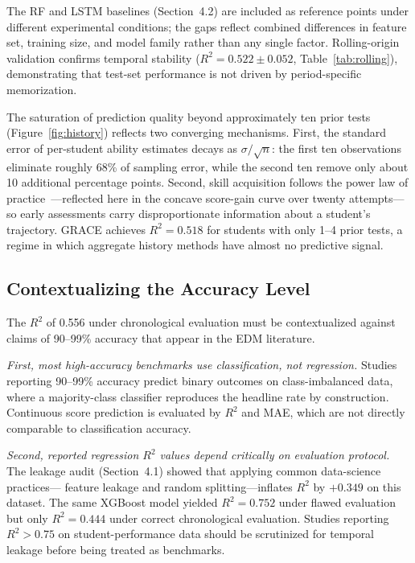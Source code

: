 \documentclass[11pt]{article}
\begin{document}
The RF and LSTM baselines (Section~4.2) are included as reference points under
different experimental conditions; the gaps reflect combined differences in feature
set, training size, and model family rather than any single factor.
Rolling-origin validation confirms temporal stability ($R^{2} = 0.522 \pm 0.052$,
Table~\ref{tab:rolling}), demonstrating that test-set performance is not driven by
period-specific memorization.

The saturation of prediction quality beyond approximately ten prior tests
(Figure~\ref{fig:history}) reflects two converging mechanisms.
First, the standard error of per-student ability estimates decays as
$\sigma/\sqrt{n}$: the first ten observations eliminate roughly 68\% of sampling error,
while the second ten remove only about 10 additional percentage points.
Second, skill acquisition follows the power law of practice~\cite{newell1981}---reflected
here in the concave score-gain curve over twenty attempts---so early assessments carry
disproportionate information about a student's trajectory.
GRACE achieves $R^{2} = 0.518$ for students with only 1--4 prior tests,
a regime in which aggregate history methods have almost no predictive signal.

\subsection{Contextualizing the Accuracy Level}

The $R^{2}$ of 0.556 under chronological evaluation must be contextualized against
claims of 90--99\% accuracy that appear in the EDM literature.

\textit{First, most high-accuracy benchmarks use classification, not regression.}\quad
Studies reporting 90--99\% accuracy predict binary outcomes on class-imbalanced data,
where a majority-class classifier reproduces the headline rate by construction.
Continuous score prediction is evaluated by $R^{2}$ and MAE, which are not directly comparable
to classification accuracy.

\textit{Second, reported regression $R^{2}$ values depend critically on evaluation protocol.}\quad
The leakage audit (Section~4.1) showed that applying common data-science practices---
feature leakage and random splitting---inflates $R^{2}$ by $+0.349$ on this dataset.
The same XGBoost model yielded $R^{2} = 0.752$ under flawed evaluation but only
$R^{2} = 0.444$ under correct chronological evaluation.
Studies reporting $R^{2} > 0.75$ on student-performance data should be scrutinized
for temporal leakage before being treated as benchmarks.
\end{document}
